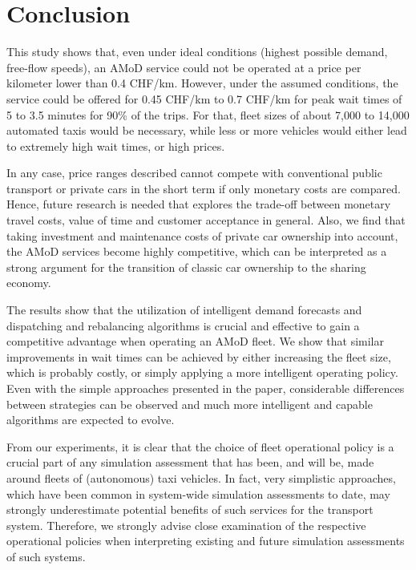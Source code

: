 \section{Conclusion}
\label{sec:Conclusion}

This study shows that, even under ideal conditions (highest possible demand, free-flow speeds), an AMoD service could not be operated at a price per kilometer lower than 0.4 CHF/km. However, under the assumed conditions, the service could be offered for 0.45 CHF/km to 0.7 CHF/km for peak wait times of 5 to 3.5 minutes for 90\% of the trips. For that, fleet sizes of about 7,000 to 14,000 automated taxis would be necessary, while less or more vehicles would either lead to extremely high wait times, or high prices.


In any case, price ranges described cannot compete with conventional public transport or private cars in the short term if only monetary costs are compared. Hence, future research is needed that explores the trade-off between monetary travel costs, value of time and customer acceptance in general. Also, we find that taking investment and maintenance costs of private car ownership into account, the AMoD services become highly competitive, which can be interpreted as a strong argument for the transition of classic car ownership to the sharing economy.


The results show that the utilization of intelligent demand forecasts and dispatching and rebalancing algorithms is crucial and effective to gain a competitive advantage when operating an AMoD fleet. We show that similar improvements in wait times can be achieved by either increasing the fleet size, which is probably costly, or simply applying a more intelligent operating policy. Even with the simple approaches presented in the paper, considerable differences between strategies can be observed and much more intelligent and capable algorithms are expected to evolve.


From our experiments, it is clear that the choice of fleet operational policy is a crucial part of any simulation assessment that has been, and will be, made around fleets of (autonomous) taxi vehicles. In fact, very simplistic approaches, which have been common in system-wide simulation assessments to date, may strongly underestimate potential benefits of such services for the transport system. Therefore, we strongly advise close examination of the respective operational policies when interpreting existing and future simulation assessments of such systems.